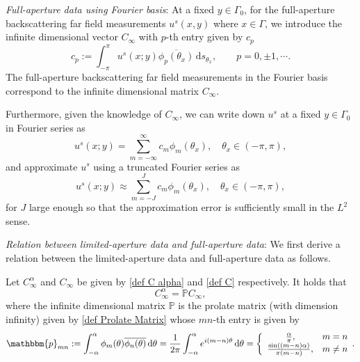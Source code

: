\documentclass[final]{siamltex}
\newcommand{\ind}{\,\mbox{d}}
\begin{document}
\vspace{1\baselineskip}

\noindent\textit{Full-aperture data using Fourier basis}: At a fixed $y \in \Gamma_0$, for the full-aperture backscattering far field measurements $u^s(x,y)$ where $x \in \Gamma$, we introduce  the infinite dimensional vector $C_\infty$ with $p$-th entry given by $c_{p}$
\begin{equation} \label{def C}
c_{p} :=\int_{-\pi}^{\pi}  u^{s}(x;y)\overline{\phi_p(\theta_x)  }\ind s_{\theta_x} , \qquad p = 0, \pm 1,\cdots.
\end{equation}
The full-aperture backscattering far field measurements in the  Fourier basis correspond to the infinite dimensional matrix $C_\infty$.

Furthermore, given the knowledge of $C_\infty$, we can write down $u^{s}$ at a fixed $y \in \Gamma_0$ in  Fourier series as
\begin{equation}  \label{C to far field infinite}
u^s(x;y) = \sum_{m=-\infty}^{\infty}  c_{m}\phi_m(\theta_x), \quad \theta_x \in (-\pi,\pi),
\end{equation}
and approximate $u^s$ using a truncated Fourier series as
\begin{equation} \label{C to far field finite}
u^s(x;y) \approx \sum_{m=-J}^{J} c_{m}\phi_m(\theta_x)  , \quad \theta_x   \in (-\pi,\pi),
\end{equation}
for $J$ large enough so that the approximation error is sufficiently small in the $L^2$ sense.

\vspace{1\baselineskip}

\noindent\textit{Relation between limited-aperture data and full-aperture data}:
We first derive a relation between the limited-aperture data and full-aperture data as follows.
\begin{lemma} \label{thm far field case partial to full infinite}
Let $C^\alpha_\infty$ and $C_\infty$ be given by \eqref{def C alpha} and \eqref{def C} respectively. It holds that
\begin{equation} \label{far field case partial to full infinite}
C^{\alpha}_\infty = \mathbb{P}C_\infty,
\end{equation}
where the infinite dimensional matrix $\mathbb{P}$ is the prolate matrix (with dimension infinity)  given by \eqref{def Prolate Matrix} whose $mn$-th entry is given by
\begin{equation} \label{def Prolate Matrix}
\mathbbm{p}_{mn}
:= \int_{-\alpha}^\alpha \phi_m(\theta) \overline{\phi_n(\theta)} \ind \theta
= \frac{1}{2\pi}\int_{-\alpha}^\alpha e^{i(m-n)\theta} \ind \theta
=
\bigg\{
\begin{array}{cc}
\frac{\alpha}{\pi},  &  m=n    \\
\frac{\sin((m-n)\alpha)}{\pi (m-n)}, &     m\not=n
\end{array}
.
\end{equation}

\end{lemma}
\end{document}
